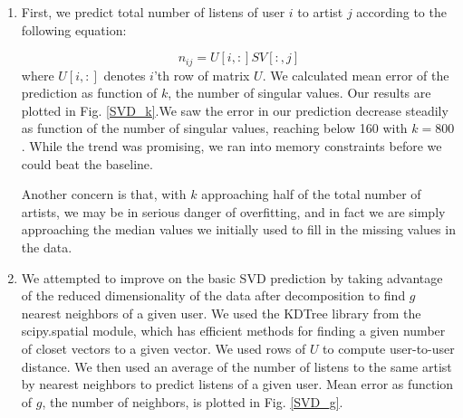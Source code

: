 \documentclass[11pt]{article}
\begin{document}
\begin{enumerate}
\item First, we predict total number of listens of user $i$ to artist $j$ according to the following equation:

\begin{equation}
n_{ij} = U[i,:]SV[:,j]
\end{equation}
where $U[i,:]$ denotes $i$'th row of matrix $U$. We calculated mean error of the prediction as function of $k$, the number of singular values. Our results are plotted in Fig. \ref{SVD_k}.We saw the error in our prediction decrease steadily as function of the number of singular values, reaching below 160 with $k = 800$. While the trend was promising, we ran into memory constraints before we could beat the baseline. 

Another concern is that, with $k$ approaching half of the total number of artists, we may be in serious danger of overfitting, and in fact we are simply approaching the median values we initially used to fill in the missing values in the data.

\item We attempted to improve on the basic SVD prediction by taking advantage of the reduced dimensionality of the data after decomposition to find $g$ nearest neighbors of a given user. We used  the KDTree library from the scipy.spatial module, which has efficient methods for finding a given number of closet vectors to a given vector. We used rows of $U$ to compute user-to-user distance. We then used an average of the number of listens to the same artist by nearest neighbors to predict listens of a given user. Mean error as function of $g$, the number of neighbors, is plotted in Fig. \ref{SVD_g}.
\end{enumerate}
\end{document}
